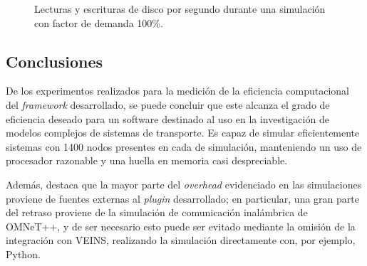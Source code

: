 \begin{figure}[tpb]
    \centering
    
    \caption[I/O en disco durante simulación]{Lecturas y escrituras de disco por segundo durante una simulación con factor de demanda 100\%.}
    \label{fig:systemload:io}
\end{figure} 

\subsection{Conclusiones}

De los experimentos realizados para la medición de la eficiencia computacional del \emph{framework} desarrollado, se puede concluir que este alcanza el grado de eficiencia deseado para un software destinado al uso en la investigación de modelos complejos de sistemas de transporte. Es capaz de simular eficientemente sistemas con 1400 nodos presentes en cada de simulación, manteniendo un uso de procesador razonable y una huella en memoria casi despreciable. 

Además, destaca que la mayor parte del \emph{overhead} evidenciado en las simulaciones proviene de fuentes externas al \emph{plugin} desarrollado; en particular, una gran parte del retraso proviene de la simulación de comunicación inalámbrica de OMNeT++, y de ser necesario esto puede ser evitado mediante la omisión de la integración con VEINS, realizando la simulación directamente con, por ejemplo, Python.
